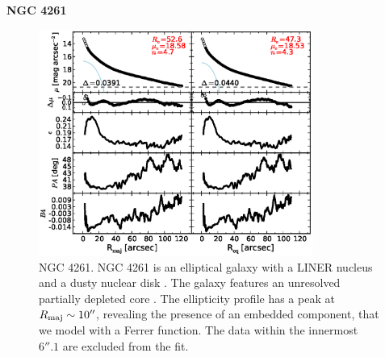 \documentclass[preprint2]{emulateapj}
\newcommand{\fitfigurewidth}{0.8\textwidth}
\begin{document}
  \clearpage\newpage\noindent
  {\bf NGC 4261 \\}

  \begin{figure}[h]
  \begin{center}
  \includegraphics[width=\fitfigurewidth]{images/n4261_1Dfit.eps}
  \caption{NGC 4261.
  NGC 4261 is an elliptical galaxy with a LINER nucleus \citep{veroncettyveron2006}
  and a dusty nuclear disk \citep{tran2001}.
  The galaxy features an unresolved partially depleted core \citep{rusli2013}. %
  The ellipticity profile has a peak at $R_{\rm maj} \sim 10''$, revealing the presence of an embedded component, 
  that we model with a Ferrer function.
  The data within the innermost $6''.1$ are excluded from the fit.
  }
  \end{center}
  \end{figure}
\end{document}

